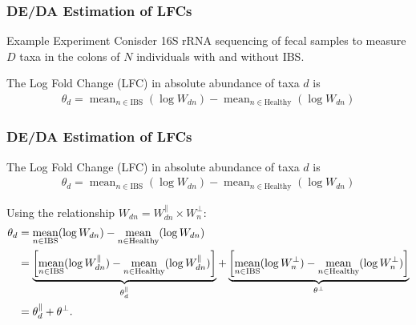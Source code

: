 \documentclass[11pt]{beamer}
\DeclareMathOperator*{\mean}{mean}
\begin{document}
\begin{frame}
  \frametitle{DE/DA Estimation of LFCs}

  \begin{block}{Example Experiment}
        Conisder 16S rRNA sequencing of fecal samples to measure \(D\) taxa in the colons of \(N\) individuals with and without IBS.
  \end{block}

  \vspace{15px}
  
  The Log Fold Change (LFC) in absolute abundance of taxa \(d\) is
  \begin{align*}
    \theta_d = \mean_{n \in \text{IBS}}(\log W_{dn}) - \mean_{n \in \text{Healthy}}(\log W_{dn} )
  \end{align*}

\end{frame}

\begin{frame}
  \frametitle{DE/DA Estimation of LFCs}
  
  The Log Fold Change (LFC) in absolute abundance of taxa \(d\) is
  \begin{align*}
    \theta_d = \mean_{n \in \text{IBS}}(\log W_{dn}) - \mean_{n \in \text{Healthy}}(\log W_{dn} )
  \end{align*}

  Using the relationship \(W_{dn} = W^\parallel_{dn} \times W^\perp_n\):
  {\small
  \begin{align*}
    \small
    \theta_{d} &= \mean_{n \in \text{IBS}}(\log W_{dn})-\mean_{n \in \text{Healthy}}(\log W_{dn}) \\
&= \underbrace{\left[\mean_{n \in \text{IBS}}(\log W^{\parallel}_{dn}) - \mean_{n \in \text{Healthy}}(\log
    W^{\parallel}_{dn})\right]}_{\theta^\parallel_d}+\underbrace{\left[\mean_{n \in \text{IBS}}(\log W^{\perp}_{n}) - \mean_{n \in \text{Healthy}}(\log W^{\perp}_{n})\right]}_{\theta^\perp} \label{eq:diff-analysis-2} \\
                         &= \theta_{d}^{\parallel}+\theta^\perp. \nonumber
  \end{align*}
  }%
\end{frame}
\end{document}
